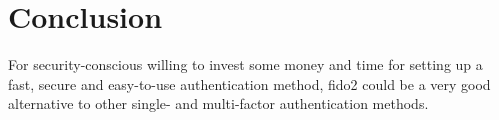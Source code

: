 
\section{Conclusion}
\label{sec:conclusion}


For security-conscious willing to invest some money and time for setting up a fast, secure and easy-to-use authentication method, \ac{fido2} could be a very good alternative to other single- and multi-factor authentication methods.